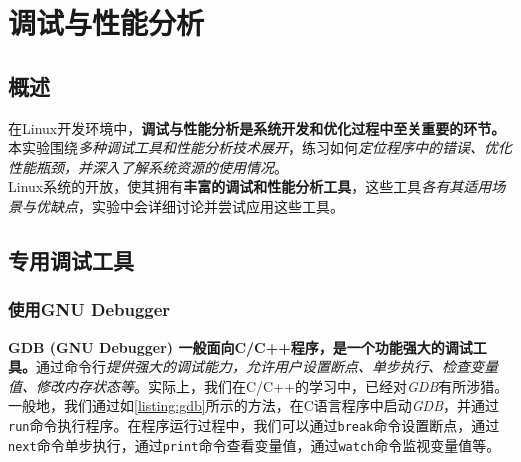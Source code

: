 \chapter{调试与性能分析}
\label{cp:debug}

\section{概述}

在Linux开发环境中，\textbf{调试与性能分析是系统开发和优化过程中至关重要的环节。}本实验围绕\textit{多种调试工具和性能分析技术展开}，练习如何\textit{定位程序中的错误、优化性能瓶颈，并深入了解系统资源的使用情况}。\\

Linux系统的开放，使其拥有\textbf{丰富的调试和性能分析工具}，这些工具\textit{各有其适用场景与优缺点}，实验中会详细讨论并尝试应用这些工具。

\section{专用调试工具}

\subsection{使用GNU Debugger}

\textbf{GDB (GNU Debugger) 一般面向C/C++程序，是一个功能强大的调试工具。}通过命令行\textit{提供强大的调试能力，允许用户设置断点、单步执行、检查变量值、修改内存状态等}。实际上，我们在C/C++的学习中，已经对\textit{GDB}有所涉猎。\\

一般地，我们通过如\ref{listing:gdb}所示的方法，在C语言程序中启动\textit{GDB}，并通过\texttt{run}命令执行程序。在程序运行过程中，我们可以通过\texttt{break}命令设置断点，通过\texttt{next}命令单步执行，通过\texttt{print}命令查看变量值，通过\texttt{watch}命令监视变量值等。\\

